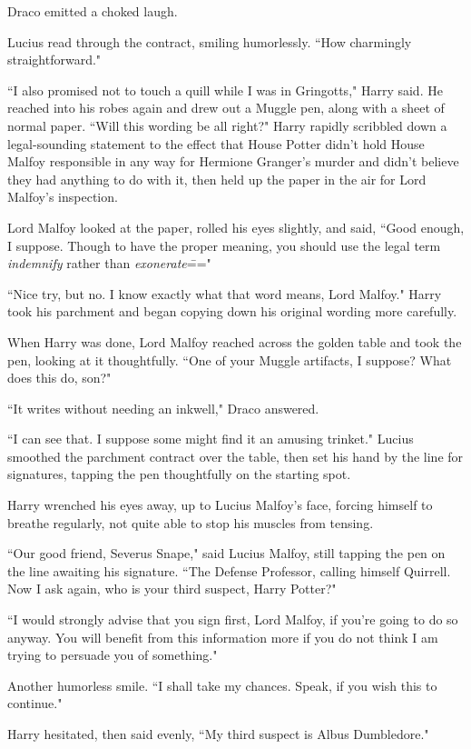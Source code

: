 Draco emitted a choked laugh.

Lucius read through the contract, smiling humorlessly. ``How charmingly straightforward."

``I also promised not to touch a quill while I was in Gringotts," Harry said. He reached into his robes again and drew out a Muggle pen, along with a sheet of normal paper. ``Will this wording be all right?" Harry rapidly scribbled down a legal-sounding statement to the effect that House Potter didn't hold House Malfoy responsible in any way for Hermione Granger's murder and didn't believe they had anything to do with it, then held up the paper in the air for Lord Malfoy's inspection.

Lord Malfoy looked at the paper, rolled his eyes slightly, and said, ``Good enough, I suppose. Though to have the proper meaning, you should use the legal term \emph{indemnify} rather than \emph{exonerate}\==="

``Nice try, but no. I know exactly what that word means, Lord Malfoy." Harry took his parchment and began copying down his original wording more carefully.

When Harry was done, Lord Malfoy reached across the golden table and took the pen, looking at it thoughtfully. ``One of your Muggle artifacts, I suppose? What does this do, son?"

``It writes without needing an inkwell," Draco answered.

``I can see that. I suppose some might find it an amusing trinket." Lucius smoothed the parchment contract over the table, then set his hand by the line for signatures, tapping the pen thoughtfully on the starting spot.

Harry wrenched his eyes away, up to Lucius Malfoy's face, forcing himself to breathe regularly, not quite able to stop his muscles from tensing.

``Our good friend, Severus Snape," said Lucius Malfoy, still tapping the pen on the line awaiting his signature. ``The Defense Professor, calling himself Quirrell. Now I ask again, who is your third suspect, Harry Potter?"

``I would strongly advise that you sign first, Lord Malfoy, if you're going to do so anyway. You will benefit from this information more if you do not think I am trying to persuade you of something."

Another humorless smile. ``I shall take my chances. Speak, if you wish this to continue."

Harry hesitated, then said evenly, ``My third suspect is Albus Dumbledore."

